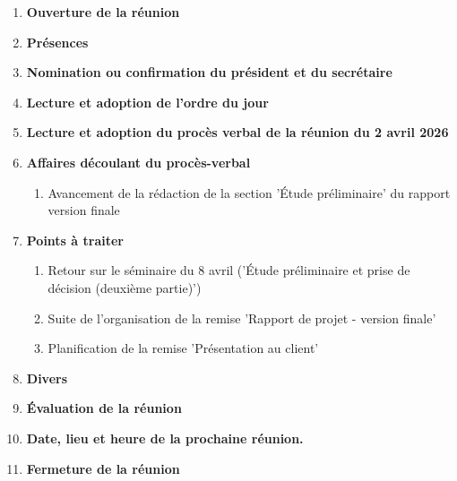 \documentclass[12pt]{ULojpv}
\begin{document}
\entete
\begin{enumerate}
   \item \textbf{Ouverture de la réunion}
   \item \textbf{Présences}
   \item \textbf{Nomination ou confirmation du président et du secrétaire}
   \item \textbf{Lecture et adoption de l'ordre du jour}
   \item \textbf{Lecture et adoption du procès verbal de la réunion du 2 avril 2026}
   \item \textbf{Affaires découlant du procès-verbal}
      \begin{enumerate}
         \item Avancement de la rédaction de la section 'Étude préliminaire' du rapport version finale
      \end{enumerate}
   \item \textbf{Points à traiter}
      \begin{enumerate}
         \item Retour sur le séminaire du 8 avril ('Étude préliminaire et prise de décision (deuxième partie)')
        \item Suite de l'organisation de la remise 'Rapport de projet - version finale'
        \item Planification de la remise 'Présentation au client'
      \end{enumerate}
   \item \textbf{Divers}
   \item \textbf{Évaluation de la réunion}
   \item \textbf{Date, lieu et heure de la prochaine réunion.}
   \item \textbf{Fermeture de la réunion}
\end{enumerate}
\end{document}
